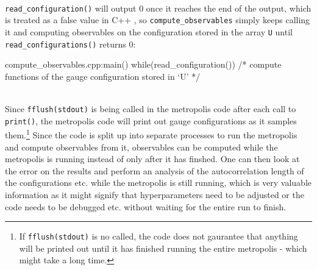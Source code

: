 \documentclass[11pt]{article}
\begin{document}
\\

\lstinline{read_configuration()} will output 0 once it reaches the end of the output, which is treated as a false value in C++	, so \lstinline{compute_observables} simply keeps calling it and computing observables on the configuration stored in the array \lstinline{U} until \lstinline{read_configurations()} returns 0:\\

\begin{code}{compute\_observables.cpp:main()}
while(read_configuration()){
	/* compute functions of the gauge configuration stored in `U' */
}
\end{code}\\

Since \lstinline{fflush(stdout)} is being called in the metropolis code after each call to \lstinline{print()}, the metropolis code will print out gauge configurations as it samples them.\footnote{If \lstinline{fflush(stdout)} is no called, the code does not gaurantee that anything will be printed out until it has finished running the entire metropolis - which might take a long time.} Since the code is split up into separate processes to run the metropolis and compute observables from it, observables can be computed while the metropolis is running instead of only after it has finshed. One can then look at the error on the results and perform an analysis of the autocorrelation length of the configurations etc. while the metropolis is still running, which is very valuable information as it might signify that hyperparameters need to be adjusted or the code needs to be debugged etc. without waiting for the entire run to finish.
\end{document}
